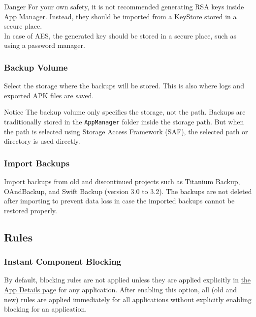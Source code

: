 \begin{danger}{Danger}
    For your own safety, it is not recommended generating RSA keys inside App Manager. Instead, they should be imported from a KeyStore stored in a secure place.\\
    In case of AES, the generated key should be stored in a secure place, such as using a password manager.
\end{danger}

\subsubsection{Backup Volume}\label{subsubsec:backup-volume} %
Select the storage where the backups will be stored. This is also where logs and exported APK files are saved.

\begin{tip}{Notice}
    The backup volume only specifies the storage, not the path. Backups are traditionally stored in the \texttt{AppManager} folder inside the storage path.
    But when the path is selected using Storage Access Framework (SAF), the selected path or directory is used directly.
\end{tip}

\subsubsection{Import Backups} %
Import backups from old and discontinued projects such as Titanium Backup, OAndBackup, and Swift Backup (version 3.0 to 3.2).
The backups are not deleted after importing to prevent data loss in case the imported backups cannot be restored properly.

\subsection{Rules}\label{subsec:rules} %

\subsubsection{Instant Component Blocking}\label{subsubsec:instant-component-blocking} %
By default, blocking rules are not applied unless they are applied explicitly in \hyperref[sec:app-details-page]{the App Details page} for any application.
After enabling this option, all (old and new) rules are applied immediately for all applications without explicitly enabling blocking for an application.

